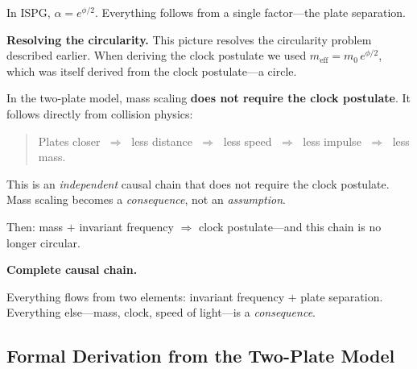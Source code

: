 \documentclass[11pt]{article}
\begin{document}
In ISPG, $\alpha = e^{\phi/2}$. Everything follows from a single
factor---the plate separation.

\medskip
\textbf{Resolving the circularity.}
This picture resolves the circularity problem described earlier.
When deriving the clock postulate we used
$m_{\mathrm{eff}} = m_0\,e^{\phi/2}$, which was itself derived
from the clock postulate---a circle.

In the two-plate model, mass scaling \textbf{does not require the
clock postulate}. It follows directly from collision physics:
\begin{quote}
Plates closer $\;\Rightarrow\;$ less distance $\;\Rightarrow\;$
less speed $\;\Rightarrow\;$ less impulse $\;\Rightarrow\;$ less
mass.
\end{quote}
This is an \emph{independent} causal chain that does not require
the clock postulate. Mass scaling becomes a \emph{consequence}, not
an \emph{assumption}.

Then: mass $+$ invariant frequency $\Rightarrow$ clock
postulate---and this chain is no longer circular.

\medskip
\textbf{Complete causal chain.}
\begin{center}
\end{center}

Everything flows from two elements: invariant frequency $+$ plate
separation. Everything else---mass, clock, speed of light---is a
\emph{consequence}.

\subsection{Formal Derivation from the Two-Plate Model}
\label{sec:two_plate_derivation}
\end{document}

